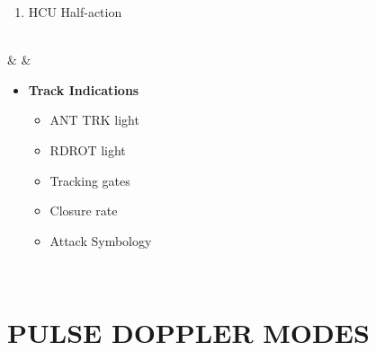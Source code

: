 \documentclass[fontInter]{TechCheck}
\begin{document}
\begin{listlongtable}
\begin{minipage}[t]{\linewidth}
\begin{itemize}
\begin{enumerate}[label=(\alph*), resume]
					\item HCU Half-action
				\end{enumerate}
			\end{itemize}
		\end{minipage} \\
		\midrule
		\textbf{\textbullet} &  &
		\begin{minipage}[t]{\linewidth}
			\vspace{-7pt}
			\begin{itemize}
				\item \textbf{Track Indications}
				\begin{itemize}
					\item ANT TRK light
					\item RDROT light
					\item Tracking gates
					\item Closure rate
					\item Attack Symbology
				\end{itemize}
			\end{itemize}
		\end{minipage} \\
	\end{listlongtable}

	\clearpage

	\section{PULSE DOPPLER MODES}
\end{document}
